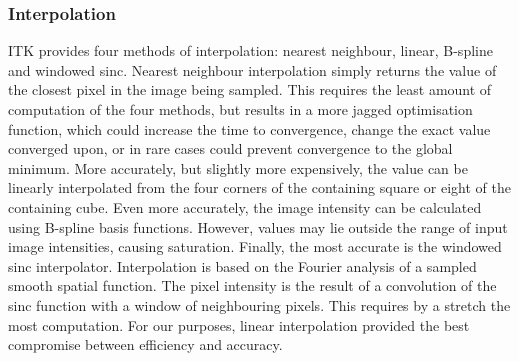     \subsubsection{Interpolation} %
    \label{ssub:interpolation}
      ITK provides four methods of interpolation: nearest neighbour, linear, B-spline and windowed sinc. Nearest neighbour interpolation simply returns the value of the closest pixel in the image being sampled. This requires the least amount of computation of the four methods, but results in a more jagged optimisation function, which could increase the time to convergence, change the exact value converged upon, or in rare cases could prevent convergence to the global minimum. More accurately, but slightly more expensively, the value can be linearly interpolated from the four corners of the containing square or eight of the containing cube. Even more accurately, the image intensity can be calculated using B-spline basis functions. However, values may lie outside the range of input image intensities, causing saturation. Finally, the most accurate is the windowed sinc interpolator. Interpolation is based on the Fourier analysis of a sampled smooth spatial function. The pixel intensity is the result of a convolution of the sinc function with a window of neighbouring pixels. This requires by a stretch the most computation. For our purposes, linear interpolation provided the best compromise between efficiency and accuracy.
  
